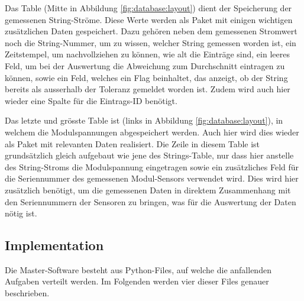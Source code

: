 Das Table  (Mitte  in Abbildung \ref{fig:database:layout}) dient
der Speicherung  der gemessenen String-Str\"ome. Diese Werte  werden als Paket
mit einigen  wichtigen zus\"atzlichen Daten gespeichert. Dazu  geh\"oren neben
dem gemessenen Stromwert noch die  String-Nummer, um zu wissen, welcher String
gemessen worden ist,  ein Zeitstempel, um nachvollziehen zu  k\"onnen, wie alt
die Eintr\"age  sind, ein leeres  Feld, um  bei der Auswertung  die Abweichung
zum  Durchschnitt eintragen  zu k\"onnen,  sowie  ein Feld,  welches ein  Flag
beinhaltet, das  anzeigt, ob  der String bereits  als ausserhalb  der Toleranz
gemeldet  worden  ist. Zudem wird  auch  hier  wieder  eine Spalte  f\"ur  die
Eintrags-ID ben\"otigt.

Das  letzte  und  gr\"osste  Table   ist    (links  in  Abbildung
\ref{fig:database:layout}),  in  welchem   die  Modulspannungen  abgespeichert
werden. Auch  hier   wird  dies   wieder  als   Paket  mit   relevanten  Daten
realisiert. Die  Zeile in  diesem Table  ist grunds\"atzlich  gleich aufgebaut
wie  jene des  Strings-Table, nur  dass  hier anstelle  des String-Stroms  die
Modulspannung eingetragen sowie ein zus\"atzliches Feld f\"ur die Seriennummer
des  gemessenen  Modul-Sensors  verwendet wird. Dies  wird  hier  zus\"atzlich
ben\"otigt,  um  die  gemessenen  Daten   in  direktem  Zusammenhang  mit  den
Seriennummern  der Sensoren  zu bringen,  was f\"ur  die Auswertung  der Daten
n\"otig ist.


\subsection{Implementation}
\label{subsec:software:master:implementation}

Die  Master-Software  besteht aus  Python-Files,  auf  welche die  anfallenden
Aufgaben  verteilt  werden. Im  Folgenden  werden vier  dieser  Files  genauer
beschrieben.


\subsubsection{}
\label{subsubsec:software:master:implementation:database}

